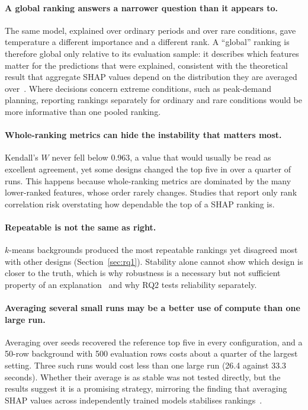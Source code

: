 \documentclass[11pt,a4paper]{article}
\begin{document}
\paragraph{A global ranking answers a narrower question than it appears to.} The same model, explained over ordinary periods and over rare conditions, gave temperature a different importance and a different rank. A ``global'' ranking is therefore global only relative to its evaluation sample: it describes which features matter for the predictions that were explained, consistent with the theoretical result that aggregate SHAP values depend on the distribution they are averaged over~\cite{bhattacharjee2025}. Where decisions concern extreme conditions, such as peak-demand planning, reporting rankings separately for ordinary and rare conditions would be more informative than one pooled ranking.

\paragraph{Whole-ranking metrics can hide the instability that matters most.} Kendall's $W$ never fell below 0.963, a value that would usually be read as excellent agreement, yet some designs changed the top five in over a quarter of runs. This happens because whole-ranking metrics are dominated by the many lower-ranked features, whose order rarely changes. Studies that report only rank correlation risk overstating how dependable the top of a SHAP ranking is.

\paragraph{Repeatable is not the same as right.} $k$-means backgrounds produced the most repeatable rankings yet disagreed most with other designs (Section~\ref{sec:rq1}). Stability alone cannot show which design is closer to the truth, which is why robustness is a necessary but not sufficient property of an explanation~\cite{alvarezmelis2018} and why RQ2 tests reliability separately.

\paragraph{Averaging several small runs may be a better use of compute than one large run.} Averaging over seeds recovered the reference top five in every configuration, and a 50-row background with 500 evaluation rows costs about a quarter of the largest setting. Three such runs would cost less than one large run (26.4 against 33.3 seconds). Whether their average is as stable was not tested directly, but the results suggest it is a promising strategy, mirroring the finding that averaging SHAP values across independently trained models stabilises rankings~\cite{caraker2026}.
\end{document}
